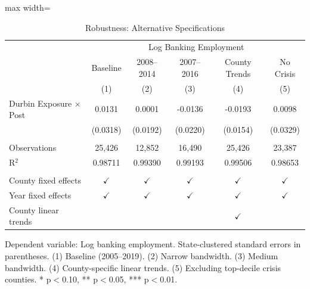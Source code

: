 
\begin{table}[htbp]
   \caption{\label{tab:robustness} Robustness: Alternative Specifications}
   \bigskip
   \centering
   \begin{adjustbox}{max width=\textwidth}
   \begin{tabular}{lccccc}
      \toprule
       & \multicolumn{5}{c}{Log Banking Employment}\\
                                    & Baseline      & 2008--2014           & 2007--2016    & County Trends & No Crisis \\
                                    & (1)           & (2)                  & (3)           & (4)           & (5)\\
      \midrule
      Durbin Exposure $\times$ Post & 0.0131        & 0.0001               & -0.0136       & -0.0193       & 0.0098\\
                                    & (0.0318)      & (0.0192)             & (0.0220)      & (0.0154)      & (0.0329)\\
       \\
      Observations                  & 25,426        & 12,852               & 16,490        & 25,426        & 23,387\\
      R$^2$                         & 0.98711       & 0.99390              & 0.99193       & 0.99506       & 0.98653\\
       \\
      County fixed effects          & $\checkmark$  & $\checkmark$         & $\checkmark$  & $\checkmark$  & $\checkmark$\\
      Year fixed effects            & $\checkmark$  & $\checkmark$         & $\checkmark$  & $\checkmark$  & $\checkmark$\\
      County linear trends         &               &                      &               & $\checkmark$  & \\
      \bottomrule
   \end{tabular}
   \end{adjustbox}
   
   \par \raggedright 
   Dependent variable: Log banking employment. State-clustered standard errors in parentheses. (1) Baseline (2005--2019). (2) Narrow bandwidth. (3) Medium bandwidth. (4) County-specific linear trends. (5) Excluding top-decile crisis counties. * p$<$0.10, ** p$<$0.05, *** p$<$0.01.
\end{table}



